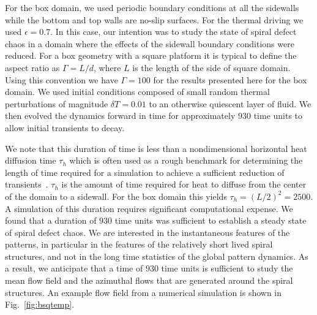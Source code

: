 \documentclass[preprint,prx,floatfix]{revtex4-1}
\begin{document}
For the box domain, we used periodic boundary conditions at all the sidewalls while the bottom and top walls are no-slip surfaces.  For the thermal driving we used $\epsilon = 0.7$. In this case, our intention was to study the state of spiral defect chaos in a domain where the effects of the sidewall boundary conditions were reduced. For a box geometry with a square platform it is typical to define the aspect ratio as $\Gamma=L/d$, where $L$ is the length of the side of square domain. Using this convention we have $\Gamma=100$ for the results presented here for the box domain. We used initial conditions composed of small random thermal perturbations of magnitude $\delta T = 0.01$ to an otherwise quiescent layer of fluid. We then evolved the dynamics forward in time for approximately 930 time units to allow initial transients to decay.

We note that this duration of time is less than a nondimensional horizontal heat diffusion time $\tau_h$ which is often used as a rough benchmark for determining the length of time required for a simulation to achieve a sufficient reduction of transients~\cite{cross:1984}. $\tau_h$ is the amount of time required for heat to diffuse from the center of the domain to a sidewall. For the box domain this yields $\tau_h \!=\! (L/2)^2 \!=\! 2500$. A simulation of this duration requires significant computational expense. We found that a duration of $930$ time units was sufficient to establish a steady state of spiral defect chaos. We are interested in the instantaneous features of the patterns, in particular in the features of the relatively short lived spiral structures, and not in the long time statistics of the global pattern dynamics. As a result, we anticipate that a time of $930$ time units is sufficient to study the mean flow field and the azimuthal flows that are generated around the spiral structures. An example flow field from a numerical simulation is shown in Fig.~\ref{fig:bsqtemp}.
\end{document}
